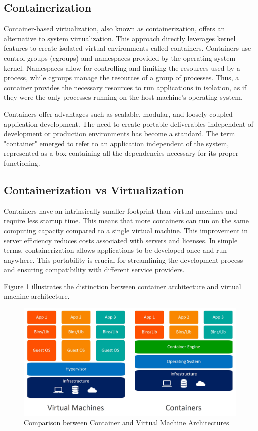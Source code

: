 \subsection{Containerization}
Container-based virtualization, also known as containerization, offers an alternative to system virtualization. This approach directly leverages kernel features to create isolated virtual environments called containers. Containers use control groups (cgroups) and namespaces provided by the operating system kernel. Namespaces allow for controlling and limiting the resources used by a process, while cgroups manage the resources of a group of processes. Thus, a container provides the necessary resources to run applications in isolation, as if they were the only processes running on the host machine's operating system.

Containers offer advantages such as scalable, modular, and loosely coupled application development. The need to create portable deliverables independent of development or production environments has become a standard. The term "container" emerged to refer to an application independent of the system, represented as a box containing all the dependencies necessary for its proper functioning.

\subsection{Containerization vs Virtualization}
Containers have an intrinsically smaller footprint than virtual machines and require less startup time. This means that more containers can run on the same computing capacity compared to a single virtual machine. This improvement in server efficiency reduces costs associated with servers and licenses. In simple terms, containerization allows applications to be developed once and run anywhere. This portability is crucial for streamlining the development process and ensuring compatibility with different service providers.

Figure \ref{fig:container_vs_vm} illustrates the distinction between container architecture and virtual machine architecture.

\begin{figure}[h]
    \centering
    \includegraphics[width=16cm]{Figures/containers-vs-vms.jpg}
    \caption{Comparison between Container and Virtual Machine Architectures}
    \label{fig:container_vs_vm}
\end{figure}

